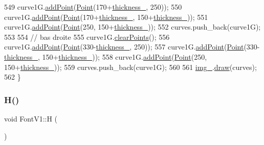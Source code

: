 \begin{DoxyCode}
549     curve1G.\mbox{\hyperlink{class_bezier_curve_a38d16c18b36ae45619b05e26e226cf34}{addPoint}}(\mbox{\hyperlink{class_point}{Point}}(170+\mbox{\hyperlink{class_font_v1_aed8040e76be9a52833627b92f0fb4e5f}{thickness\_}}, 250));
550     curve1G.\mbox{\hyperlink{class_bezier_curve_a38d16c18b36ae45619b05e26e226cf34}{addPoint}}(\mbox{\hyperlink{class_point}{Point}}(170+\mbox{\hyperlink{class_font_v1_aed8040e76be9a52833627b92f0fb4e5f}{thickness\_}}, 150+\mbox{\hyperlink{class_font_v1_aed8040e76be9a52833627b92f0fb4e5f}{thickness\_}}));
551     curve1G.\mbox{\hyperlink{class_bezier_curve_a38d16c18b36ae45619b05e26e226cf34}{addPoint}}(\mbox{\hyperlink{class_point}{Point}}(250, 150+\mbox{\hyperlink{class_font_v1_aed8040e76be9a52833627b92f0fb4e5f}{thickness\_}}));
552     curves.push\_back(curve1G);
553 
554     \textcolor{comment}{// bas droite}
555     curve1G.\mbox{\hyperlink{class_bezier_curve_a0ba8ce66d5af5971ae6a1b506029728e}{clearPoints}}();
556     curve1G.\mbox{\hyperlink{class_bezier_curve_a38d16c18b36ae45619b05e26e226cf34}{addPoint}}(\mbox{\hyperlink{class_point}{Point}}(330-\mbox{\hyperlink{class_font_v1_aed8040e76be9a52833627b92f0fb4e5f}{thickness\_}}, 250));
557     curve1G.\mbox{\hyperlink{class_bezier_curve_a38d16c18b36ae45619b05e26e226cf34}{addPoint}}(\mbox{\hyperlink{class_point}{Point}}(330-\mbox{\hyperlink{class_font_v1_aed8040e76be9a52833627b92f0fb4e5f}{thickness\_}}, 150+\mbox{\hyperlink{class_font_v1_aed8040e76be9a52833627b92f0fb4e5f}{thickness\_}}));
558     curve1G.\mbox{\hyperlink{class_bezier_curve_a38d16c18b36ae45619b05e26e226cf34}{addPoint}}(\mbox{\hyperlink{class_point}{Point}}(250, 150+\mbox{\hyperlink{class_font_v1_aed8040e76be9a52833627b92f0fb4e5f}{thickness\_}}));
559     curves.push\_back(curve1G);
560 
561     \mbox{\hyperlink{class_font_v1_a00569e3e3c4b70f437b63f396f735fb0}{img\_}}.\mbox{\hyperlink{class_image_a8d162f3cab956131d58708c09aa560b0}{draw}}(curves);
562 \}
\end{DoxyCode}
\mbox{\label{class_font_v1_aac6c3d7f8116c21fd9339d07aa63a797}} 
\subsubsection{\texorpdfstring{H()}{H()}}
{\footnotesize\ttfamily void Font\+V1\+::H (\begin{DoxyParamCaption}{ }\end{DoxyParamCaption})}



